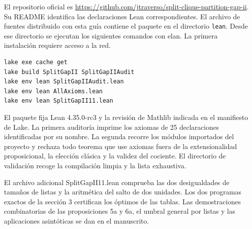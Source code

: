\documentclass[spanish,10pt,a4paper]{article}
\begin{document}
El repositorio oficial es \url{https://github.com/jtraverso/split-clique-partition-gap-ii}. Su README identifica las declaraciones Lean correspondientes. El archivo de fuentes distribuido con esta guía contiene el paquete en el directorio \texttt{lean}. Desde ese directorio se ejecutan los siguientes comandos con elan. La primera instalación requiere acceso a la red.

\begin{verbatim}
lake exe cache get
lake build SplitGapII SplitGapIIAudit
lake env lean SplitGapIIAudit.lean
lake env lean AllAxioms.lean
lake env lean SplitGapII11.lean
\end{verbatim}

El paquete fija Lean 4.35.0-rc3 y la revisión de Mathlib indicada en el manifiesto de Lake. La primera auditoría imprime los axiomas de 25 declaraciones identificadas por su nombre. La segunda recorre los módulos importados del proyecto y rechaza todo teorema que use axiomas fuera de la extensionalidad proposicional, la elección clásica y la validez del cociente. El directorio de validación recoge la compilación limpia y la lista exhaustiva.

El archivo adicional SplitGapII11.lean comprueba las dos desigualdades de tamaños de listas y la aritmética del salto de dos unidades. Los dos programas exactos de la sección 3 certifican los óptimos de las tablas. Las demostraciones combinatorias de las proposiciones 5a y 6a, el umbral general por listas y las aplicaciones asintóticas se dan en el manuscrito.
\end{document}

